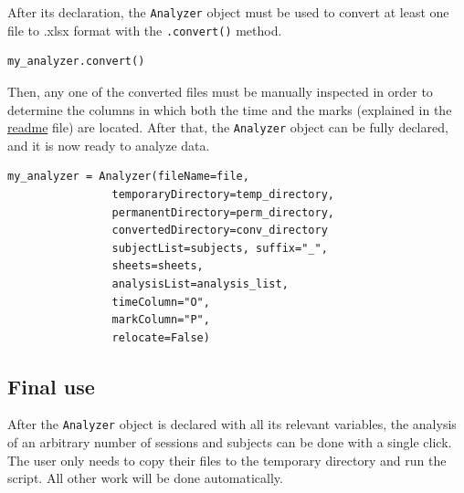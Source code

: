 \documentclass[a4paper,12pt]{article}
\begin{document}
After its declaration, the \verb|Analyzer| object must be used to convert at least one file to .xlsx format with the \verb|.convert()| method.

\begin{tcolorbox}[
    enhanced,
    attach boxed title to top left={xshift=6mm,yshift=-3mm},
    colback=lightgreen!20,
    colframe=lightgreen,
    colbacktitle=lightgreen,
    title=Python,
    fonttitle=\bfseries\color{black},
    boxed title style={size=small,colframe=lightgreen,sharp corners},
    sharp corners,
    ]
    \begin{verbatim}
my_analyzer.convert()
    \end{verbatim}
\end{tcolorbox}

Then, any one of the converted files must be manually inspected in order to determine the columns in which both the time and the marks (explained in the \href{https://github.com/JuodaanViinaa/Laboratorio/blob/translate/README.md}{readme} file) are located. After that, the \verb|Analyzer| object can be fully declared, and it is now ready to analyze data.

\begin{tcolorbox}[
    enhanced,
    attach boxed title to top left={xshift=6mm,yshift=-3mm},
    colback=lightgreen!20,
    colframe=lightgreen,
    colbacktitle=lightgreen,
    title=Python,
    fonttitle=\bfseries\color{black},
    boxed title style={size=small,colframe=lightgreen,sharp corners},
    sharp corners,
    ]
    \begin{verbatim}
my_analyzer = Analyzer(fileName=file,
                temporaryDirectory=temp_directory,
                permanentDirectory=perm_directory,
                convertedDirectory=conv_directory
                subjectList=subjects, suffix="_",
                sheets=sheets,
                analysisList=analysis_list,
                timeColumn="O",
                markColumn="P",
                relocate=False)
    \end{verbatim}
\end{tcolorbox}

\subsection{Final use}

After the \verb|Analyzer| object is declared with all its relevant variables, the analysis of an arbitrary number of sessions and subjects can be done with a single click. The user only needs to copy their files to the temporary directory and run the script. All other work will be done automatically. 
\end{document}
